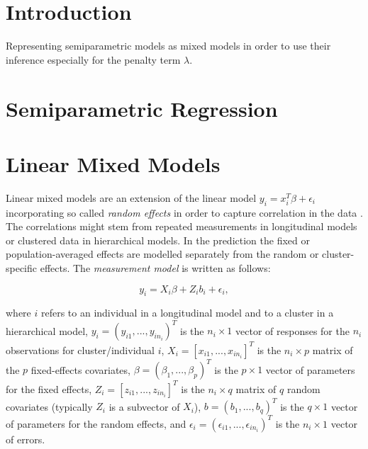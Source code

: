 \documentclass[12pt]{article}
\begin{document}
\begin{titlepage}
\clearpage
\end{titlepage}
\tableofcontents
\clearpage

\section{Introduction}

Representing semiparametric models as mixed models in order to use their inference especially for the penalty term $\lambda$.

\cite{fahrmeir2013regression}

\cite{kneib2006mixed}

\cite{wood2017generalized}

\cite{wood2011fast}

\section{Semiparametric Regression}


\section{Linear Mixed Models}

Linear mixed models are an extension of the linear model $y_i = x^T_i\beta +\epsilon_i$ incorporating so called \textit{random effects} in order to capture correlation in the data \cite{fahrmeir2013regression}. The correlations might stem from repeated measurements in longitudinal models or clustered data in hierarchical models. In the prediction the fixed or population-averaged effects are modelled separately from the random or cluster-specific effects. The \textit{measurement model} is written as follows:

$$y_i = X_i \beta + Z_i b_i + \epsilon_i,$$

where $i$ refers to an individual in a longitudinal model and to a cluster in a
hierarchical model, $y_i = ( y_{i1},...,y_{in_i} )^T$ is the $n_i \times 1$ vector of responses for the $n_i$ observations for cluster/individual $i$, $X_i = \left[ x_{i1},..., x_{in_i}\right]^T$ is the $n_i \times p$ matrix of the $p$ fixed-effects covariates, $\beta = (\beta_1,...,\beta_p)^T$ is the $p\times1$ vector of parameters for the fixed effects, $Z_i = \left[z_{i1},...,z_{in_i}\right]^T$ is the $n_i\times q$ matrix of $q$ random covariates (typically $Z_i$ is a subvector of $X_i$), $b = (b_1,...,b_q)^T$ is the $q\times1$ vector of parameters for the random effects, and $\epsilon_i = (\epsilon_{i1},...,\epsilon_{in_i})^T$ is the $n_i\times1$ vector of errors. 
\end{document}
